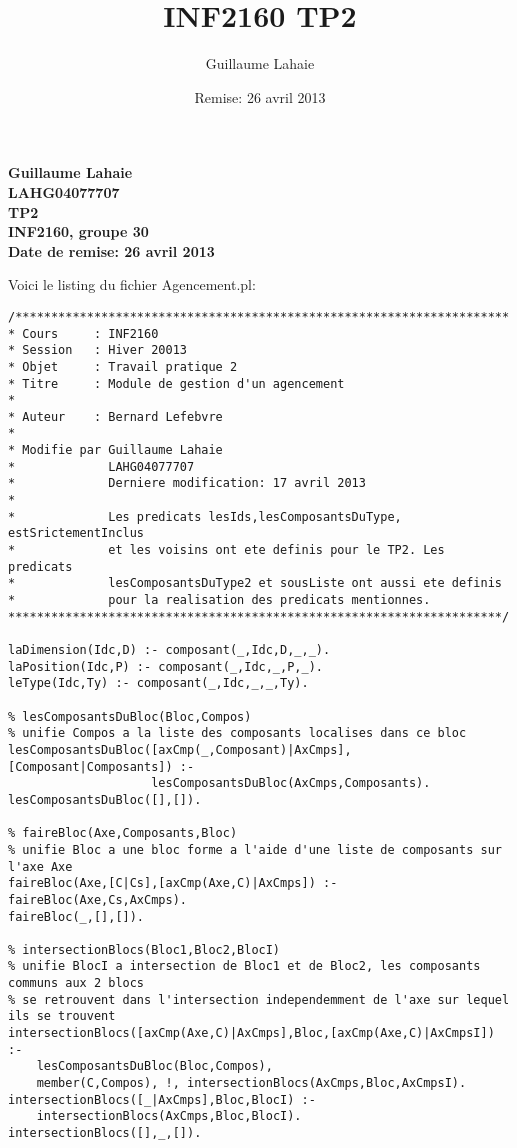 \documentclass[letterpaper,11pt]{letter}
\title{INF2160 TP2}
\author{Guillaume Lahaie}
\date{Remise: 26 avril 2013}
\begin{document}
\begin{center}{\Large{\bf Guillaume Lahaie\\
LAHG04077707\\
TP2\\
INF2160, groupe 30\\
Date de remise: 26 avril 2013}}\\
\end{center}

Voici le listing du fichier Agencement.pl:

\begin{Verbatim}[commandchars=\\\{\}]
/*********************************************************************
* Cours		: INF2160
* Session	: Hiver 20013
* Objet		: Travail pratique 2
* Titre		: Module de gestion d'un agencement
* 
* Auteur	: Bernard Lefebvre
*
* Modifie par Guillaume Lahaie
*             LAHG04077707
*             Derniere modification: 17 avril 2013
*
*             Les predicats lesIds,lesComposantsDuType, estSrictementInclus
*             et les voisins ont ete definis pour le TP2. Les predicats
*             lesComposantsDuType2 et sousListe ont aussi ete definis
*             pour la realisation des predicats mentionnes.
*********************************************************************/

laDimension(Idc,D) :- composant(_,Idc,D,_,_).
laPosition(Idc,P) :- composant(_,Idc,_,P,_).
leType(Idc,Ty) :- composant(_,Idc,_,_,Ty).

% lesComposantsDuBloc(Bloc,Compos)
% unifie Compos a la liste des composants localises dans ce bloc
lesComposantsDuBloc([axCmp(_,Composant)|AxCmps],[Composant|Composants]) :-
                    lesComposantsDuBloc(AxCmps,Composants).
lesComposantsDuBloc([],[]).

% faireBloc(Axe,Composants,Bloc)
% unifie Bloc a une bloc forme a l'aide d'une liste de composants sur l'axe Axe
faireBloc(Axe,[C|Cs],[axCmp(Axe,C)|AxCmps]) :- faireBloc(Axe,Cs,AxCmps).
faireBloc(_,[],[]).

% intersectionBlocs(Bloc1,Bloc2,BlocI)
% unifie BlocI a intersection de Bloc1 et de Bloc2, les composants communs aux 2 blocs
% se retrouvent dans l'intersection independemment de l'axe sur lequel ils se trouvent
intersectionBlocs([axCmp(Axe,C)|AxCmps],Bloc,[axCmp(Axe,C)|AxCmpsI]) :-
	lesComposantsDuBloc(Bloc,Compos),
	member(C,Compos), !, intersectionBlocs(AxCmps,Bloc,AxCmpsI).
intersectionBlocs([_|AxCmps],Bloc,BlocI) :-
	intersectionBlocs(AxCmps,Bloc,BlocI).
intersectionBlocs([],_,[]).


\end{Verbatim}
\end{document}
